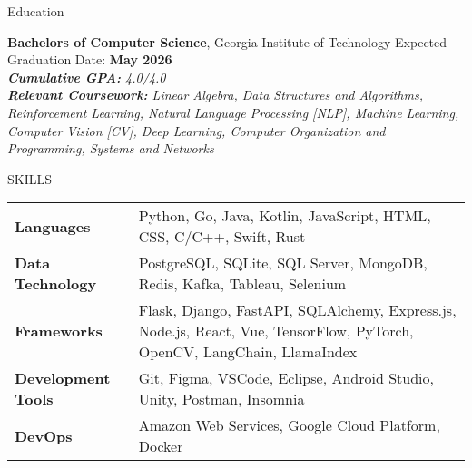\documentclass{resume} %
\begin{document}

\begin{rSection}{Education}

{\bf Bachelors of Computer Science}, Georgia Institute of Technology \hfill {Expected Graduation Date: \textbf{May 2026}}
\vspace{0.75mm} \\
\textit{\textbf{Cumulative GPA:} 4.0/4.0} \\
\textit{\textbf{Relevant Coursework:} Linear Algebra, Data Structures and Algorithms, Reinforcement Learning, Natural Language Processing [NLP], Machine Learning, Computer Vision [CV], Deep Learning, Computer Organization and Programming, Systems and Networks}

\end{rSection}

\begin{rSection}{SKILLS}

\begin{tabular}{ @{} >{\bfseries}l @{\hspace{2ex}} l }
Languages & Python, Go, Java, Kotlin, JavaScript, HTML, CSS, C/C++, Swift, Rust\\
Data Technology & PostgreSQL, SQLite, SQL Server, MongoDB, Redis, Kafka, Tableau, Selenium\\
Frameworks & Flask, Django, FastAPI, SQLAlchemy, Express.js, Node.js, React, Vue, TensorFlow, PyTorch, OpenCV, LangChain, LlamaIndex\\
Development Tools & Git, Figma, VSCode, Eclipse, Android Studio, Unity, Postman, Insomnia\\
DevOps & Amazon Web Services, Google Cloud Platform, Docker \\

\end{tabular}
\end{rSection}
\end{document}
